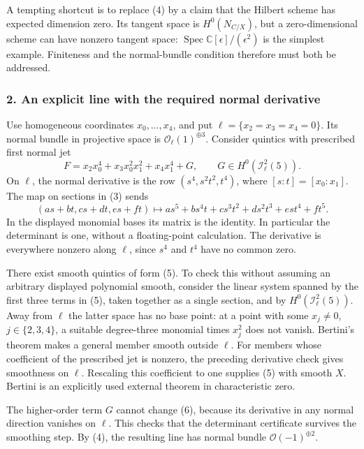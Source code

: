 \documentclass[11pt]{article}
\begin{document}
A tempting shortcut is to replace (4) by a claim that the Hilbert scheme has expected dimension zero. Its tangent space is $H^0(N_{C/X})$, but a zero-dimensional scheme can have nonzero tangent space: $\operatorname{Spec}\mathbb C[\epsilon]/(\epsilon^2)$ is the simplest example. Finiteness and the normal-bundle condition therefore must both be addressed.

\subsubsection{2. An explicit line with the required normal derivative}
Use homogeneous coordinates $x_0,\ldots,x_4$, and put
$\ell=\{x_2=x_3=x_4=0\}$. Its normal bundle in projective space is $\mathcal O_\ell(1)^{\oplus3}$. Consider quintics with prescribed first normal jet
\[
 F=x_2x_0^4+x_3x_0^2x_1^2+x_4x_1^4+G,
 \qquad G\in H^0(\mathcal I_\ell^2(5)).                \tag{5}
\]
On $\ell$, the normal derivative is the row $(s^4,s^2t^2,t^4)$, where $[s:t]=[x_0:x_1]$. The map on sections in (3) sends
\[
 (as+bt,cs+dt,es+ft)
 \longmapsto as^5+bs^4t+cs^3t^2+ds^2t^3+est^4+ft^5.  \tag{6}
\]
In the displayed monomial bases its matrix is the identity. In particular the determinant is one, without a floating-point calculation. The derivative is everywhere nonzero along $\ell$, since $s^4$ and $t^4$ have no common zero.

There exist smooth quintics of form (5). To check this without assuming an arbitrary displayed polynomial smooth, consider the linear system spanned by the first three terms in (5), taken together as a single section, and by $H^0(\mathcal I_\ell^2(5))$. Away from $\ell$ the latter space has no base point: at a point with some $x_j\ne0$, $j\in\{2,3,4\}$, a suitable degree-three monomial times $x_j^2$ does not vanish. Bertini's theorem makes a general member smooth outside $\ell$. For members whose coefficient of the prescribed jet is nonzero, the preceding derivative check gives smoothness on $\ell$. Rescaling this coefficient to one supplies (5) with smooth $X$. Bertini is an explicitly used external theorem in characteristic zero.

The higher-order term $G$ cannot change (6), because its derivative in any normal direction vanishes on $\ell$. This checks that the determinant certificate survives the smoothing step. By (4), the resulting line has normal bundle $\mathcal O(-1)^{\oplus2}$.
\end{document}
